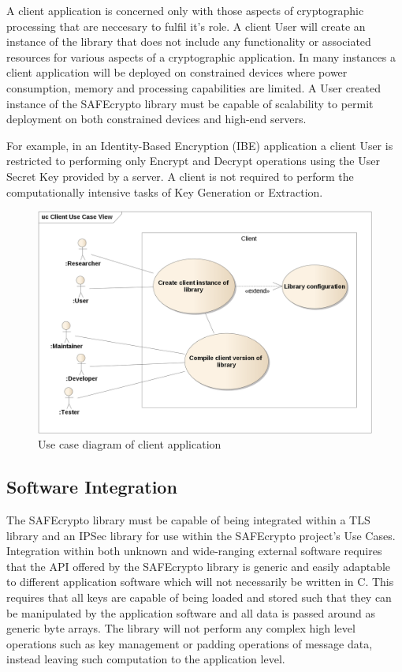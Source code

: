 A client application is concerned only with those aspects of cryptographic processing that are neccesary to fulfil it's role. A client User will create an instance of the library that does not include any functionality or associated resources for various aspects of a cryptographic application. In many instances a client application will be deployed on constrained devices where power consumption, memory and processing capabilities are limited. A User created instance of the SAFEcrypto library must be capable of scalability to permit deployment on both constrained devices and high-end servers.

For example, in an Identity-Based Encryption (IBE) application a client User is restricted to performing only Encrypt and Decrypt operations using the User Secret Key provided by a server. A client is not required to perform the computationally intensive tasks of Key Generation or Extraction.

\begin{figure}[H]
\centering
\includegraphics[width=14cm]{client_use_case_view.png}
\caption{Use case diagram of client application}
\label{fig:use_case_3}
\end{figure}


\subsection{Software Integration}

The SAFEcrypto library must be capable of being integrated within a TLS library and an IPSec library for use within the SAFEcrypto project's Use Cases. Integration within both unknown and wide-ranging external software requires that the API offered by the SAFEcrypto library is generic and easily adaptable to different application software which will not necessarily be written in C. This requires that all keys are capable of being loaded and stored such that they can be manipulated by the application software and all data is passed around as generic byte arrays. The library will not perform any complex high level operations such as key management or padding operations of message data, instead leaving such computation to the application level.

